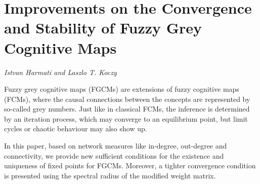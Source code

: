 \documentclass[../booklet.tex]{subfiles}
\begin{document}
\section[Improvements on the Convergence and Stability of Fuzzy Grey Cognitive Maps. {\it Istvan Harmati and Laszlo T. Koczy}]{Improvements on the Convergence and Stability of Fuzzy Grey Cognitive Maps}
 

\begin{center}
  {\it Istvan Harmati and Laszlo T. Koczy}
\end{center}

\vskip 0.8cm


Fuzzy grey cognitive maps (FGCMs) are extensions of fuzzy cognitive maps (FCMs), where the causal connections between the concepts are represented by so-called grey numbers.  Just like in classical FCMs, the inference is determined by an iteration process, which may converge to an equilibrium point, but limit cycles or chaotic behaviour may also show up.

In this paper, based on network measures like in-degree, out-degree and connectivity, we provide new sufficient conditions for the existence and uniqueness of fixed points for FGCMs. Moreover, a tighter convergence condition is presented using the spectral radius of the modified weight matrix.

\end{document}
